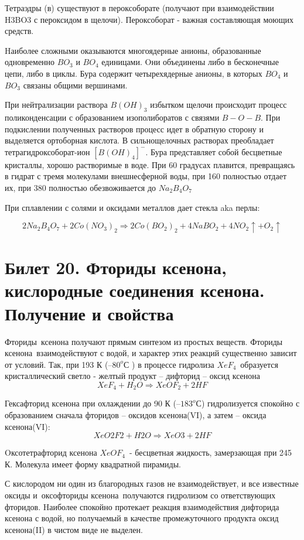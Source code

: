 \documentclass[11pt]{article}
\begin{document}
Тетраэдры (в) существуют в пероксоборате (получают при взаимодействии H3BO3 с
пероксидом в щелочи). Пероксоборат - важная составляющая моющих средств.

Hаиболее сложными оказываются многоядерные анионы, образованные одновременно
$BO_3$ и $BO_4$ единицами. Oни объединены либо в бесконечные цепи, либо в циклы. Бура
содержит четырехядерные анионы, в которых $BO_4$ и $BO_3$ связаны общими вершинами.

При нейтрализации раствора $B(OH)_3$ избытком
щелочи происходит процесс поликонденсации с
образованием изополиборатов с связями $B-O-B$. При
подкислении полученных растворов процесс идет в
обратную сторону и выделяется ортоборная
кислота.
В сильнощелочных растворах преобладает
тетрагидроксоборат-ион $[B(OH)_4]^-$.
Бура представляет собой бесцветные кристаллы,
хорошо растворимые в воде. При 60 градусах
плавится, превращаясь в гидрат с тремя молекулами внешнесферной
воды, при 160 полностью отдает их, при 380 полностью обезвоживается до
$Na_2B_4O_7$

При сплавлении с солями и оксидами металлов дает стекла aka перлы:

$$2Na_2B_4O_7 + 2Co(NO_3)_2 \Rightarrow 2Co(BO_2)_2 + 4NaBO_2 + 4NO_2\uparrow + O_2\uparrow$$

\section{Билет 20. Фториды ксенона, кислородные соединения ксенона. Получение и свойства}

Фториды ксенона получают прямым синтезом из простых веществ. Фториды ксенона взаимодействуют с водой, и характер этих реакций существенно зависит от условий. Так, при 193 К ($–80 ^o С$ ) в процессе гидролиза $XeF_4$ образуется кристаллический светло - желтый продукт – дифторид – оксид ксенона
$$XeF_4 + H_2O \Rightarrow XeOF_2 + 2HF$$

Гексафторид ксенона при охлаждении до 90 К ($–183 ^o С$) гидролизуется спокойно с образованием сначала фторидов – оксидов ксенона(VI), а затем – оксида ксенона(VI):
$$XeO2 F2 + H2O \Rightarrow XeO3 + 2HF$$

Oксотетрафторид ксенона $XeOF_4$ - бесцветная жидкость, замерзающая при 245 К. Молекула имеет форму квадратной пирамиды.

С кислородом ни один из благородных газов не взаимодействует, и все известные оксиды и оксофториды ксенона получаются гидролизом со ответствующих фторидов. Hаиболее спокойно протекает реакция взаимодействия дифторида ксенона с водой, но получаемый в качестве промежуточного продукта оксид ксенона(II) в чистом виде не выделен.
\end{document}
